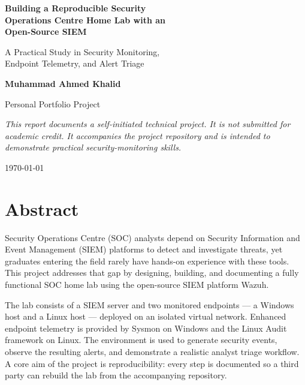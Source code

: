 \documentclass[11pt,a4paper]{article}
\begin{document}
\begin{titlepage}
    \centering
    \vspace*{2cm}

    {\Huge\bfseries\color{navy} Building a Reproducible Security\\[0.3cm]
    Operations Centre Home Lab with an\\[0.3cm]
    Open-Source SIEM\par}

    \vspace{1.5cm}
    {\Large A Practical Study in Security Monitoring,\\ Endpoint Telemetry, and Alert Triage\par}

    \vspace{2.5cm}
    {\large\textbf{Muhammad Ahmed Khalid}\par}
    \vspace{0.3cm}
    {\large Personal Portfolio Project\par}

    \vspace{2cm}
    \begin{minipage}{0.85\textwidth}
        \centering\itshape\small
        This report documents a self-initiated technical project. It is not
        submitted for academic credit. It accompanies the project repository
        and is intended to demonstrate practical security-monitoring skills.
    \end{minipage}

    \vfill
    {\large \today\par}
\end{titlepage}

\section*{Abstract}

Security Operations Centre (SOC) analysts depend on Security Information and
Event Management (SIEM) platforms to detect and investigate threats, yet
graduates entering the field rarely have hands-on experience with these tools.
This project addresses that gap by designing, building, and documenting a
fully functional SOC home lab using the open-source SIEM platform Wazuh.

The lab consists of a SIEM server and two monitored endpoints --- a Windows
host and a Linux host --- deployed on an isolated virtual network. Enhanced
endpoint telemetry is provided by Sysmon on Windows and the Linux Audit
framework on Linux. The environment is used to generate security events,
observe the resulting alerts, and demonstrate a realistic analyst triage
workflow. A core aim of the project is reproducibility: every step is
documented so a third party can rebuild the lab from the accompanying
repository.
\end{document}
